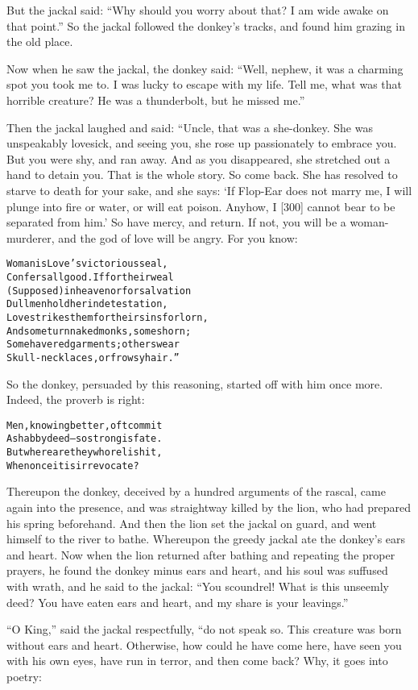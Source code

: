 \documentclass{article}
\renewenvironment{verbatim}{\begin{alltt}\normalfont\begin{centering}}{\end{centering}\end{alltt}}
\begin{document}
But the jackal said:
``Why should you worry about that? I am wide awake on that point.''
So the jackal followed the donkey's tracks, and found him grazing
in the old place.

Now when he saw the jackal, the donkey said:
``Well, nephew, it was a charming spot you took me to. I was lucky to escape with my life. Tell me, what was that horrible creature? He was a thunderbolt, but he missed me.''

Then the jackal laughed and said: “Uncle, that was a she-donkey.
She was unspeakably lovesick, and seeing you, she rose up
passionately to embrace you. But you were shy, and ran away. And as
you disappeared, she stretched out a hand to detain you. That is
the whole story. So come back. She has resolved to starve to death
for your sake, and she says:
`If Flop-Ear does not marry me, I will plunge into fire or water, or will eat poison. Anyhow, I [300] cannot bear to be separated from him.'
So have mercy, and return. If not, you will be a woman-murderer,
and the god of love will be angry. For you know:

\begin{verbatim}
Woman is Love's victorious seal,
Confers all good. If for their weal
(Supposed) in heaven or for salvation
Dull men hold her in detestation,
Love strikes them for their sins forlorn,
And some turn naked monks, some shorn;
Some have red garments; others wear
Skull-necklaces, or frowsy hair.”
\end{verbatim}
So the donkey, persuaded by this reasoning, started off with him
once more. Indeed, the proverb is right:

\begin{verbatim}
Men, knowing better, oft commit
    A shabby deed--so strong is fate.
But where are they who relish it,
    When once it is irrevocate?
\end{verbatim}
Thereupon the donkey, deceived by a hundred arguments of the
rascal, came again into the presence, and was straightway killed by
the lion, who had prepared his spring beforehand. And then the lion
set the jackal on guard, and went himself to the river to bathe.
Whereupon the greedy jackal ate the donkey's ears and heart. Now
when the lion returned after bathing and repeating the proper
prayers, he found the donkey minus ears and heart, and his soul was
suffused with wrath, and he said to the jackal:
``You scoundrel! What is this unseemly deed? You have eaten ears and heart, and my share is your leavings.''

``O King,'' said the jackal respectfully, “do not speak so. This
creature was born without ears and heart. Otherwise, how could he
have come here, have seen you with his own eyes, have run in
terror, and then come back? Why, it goes into poetry:
\end{document}
